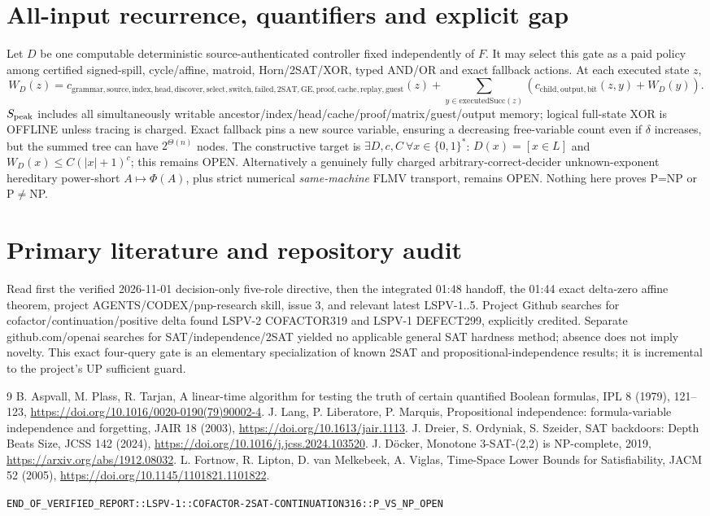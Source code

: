 \documentclass[11pt]{article}
\begin{document}
\section{All-input recurrence, quantifiers and explicit gap}
Let $D$ be one computable deterministic source-authenticated controller fixed independently of $F$. It may select this gate as a paid policy among certified signed-spill, cycle/affine, matroid, Horn/2SAT/XOR, typed AND/OR and exact fallback actions. At each executed state $z$,
\[
W_D(z)=c_{\mathrm{grammar,source,index,head,discover,select,switch,failed,2SAT,GE,proof,cache,replay,guest}}(z)
+\sum_{y\in\mathrm{executedSucc}(z)}(c_{\mathrm{child,output,bit}}(z,y)+W_D(y)).
\]
$S_{\rm peak}$ includes all simultaneously writable ancestor/index/head/cache/proof/matrix/guest/output memory; logical full-state XOR is OFFLINE unless tracing is charged. Exact fallback pins a new source variable, ensuring a decreasing free-variable count even if $\delta$ increases, but the summed tree can have $2^{\Theta(n)}$ nodes. The constructive target is $\exists D,c,C\ \forall x\in\{0,1\}^*$: $D(x)=[x\in L]$ and $W_D(x)\le C(|x|+1)^c$; this remains OPEN. Alternatively a genuinely fully charged arbitrary-correct-decider unknown-exponent hereditary power-short $A\mapsto\Phi(A)$, plus strict numerical \emph{same-machine} FLMV transport, remains OPEN. Nothing here proves P=NP or P$\ne$NP.
\section{Primary literature and repository audit}
Read first the verified 2026-11-01 decision-only five-role directive, then the integrated 01:48 handoff, the 01:44 exact delta-zero affine theorem, project AGENTS/CODEX/pnp-research skill, issue 3, and relevant latest LSPV-1..5. Project Github searches for cofactor/continuation/positive delta found LSPV-2 COFACTOR319 and LSPV-1 DEFECT299, explicitly credited. Separate github.com/openai searches for SAT/independence/2SAT yielded no applicable general SAT hardness method; absence does not imply novelty. This exact four-query gate is an elementary specialization of known 2SAT and propositional-independence results; it is incremental to the project's UP sufficient guard.
\begin{thebibliography}{9}
 B. Aspvall, M. Plass, R. Tarjan, A linear-time algorithm for testing the truth of certain quantified Boolean formulas, IPL 8 (1979), 121--123, \url{https://doi.org/10.1016/0020-0190(79)90002-4}.
 J. Lang, P. Liberatore, P. Marquis, Propositional independence: formula-variable independence and forgetting, JAIR 18 (2003), \url{https://doi.org/10.1613/jair.1113}.
 J. Dreier, S. Ordyniak, S. Szeider, SAT backdoors: Depth Beats Size, JCSS 142 (2024), \url{https://doi.org/10.1016/j.jcss.2024.103520}.
 J. D\"ocker, Monotone 3-SAT-(2,2) is NP-complete, 2019, \url{https://arxiv.org/abs/1912.08032}.
 L. Fortnow, R. Lipton, D. van Melkebeek, A. Viglas, Time-Space Lower Bounds for Satisfiability, JACM 52 (2005), \url{https://doi.org/10.1145/1101821.1101822}.
\end{thebibliography}
\noindent\texttt{END\_OF\_VERIFIED\_REPORT::LSPV-1::COFACTOR-2SAT-CONTINUATION316::P\_VS\_NP\_OPEN}
\end{document}
